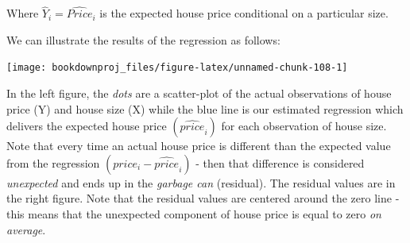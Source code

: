 \documentclass[
]{book}
\newenvironment{Shaded}{\begin{snugshade}}{\end{snugshade}}
\newcommand{\AttributeTok}[1]{\textcolor[rgb]{0.77,0.63,0.00}{#1}}
\newcommand{\DecValTok}[1]{\textcolor[rgb]{0.00,0.00,0.81}{#1}}
\newcommand{\FunctionTok}[1]{\textcolor[rgb]{0.00,0.00,0.00}{#1}}
\newcommand{\NormalTok}[1]{#1}
\newcommand{\SpecialCharTok}[1]{\textcolor[rgb]{0.00,0.00,0.00}{#1}}
\newcommand{\StringTok}[1]{\textcolor[rgb]{0.31,0.60,0.02}{#1}}
\begin{document}
Where \(\hat{Y}_i=\hat{Price}_i\) is the expected house price conditional on a particular size.

We can illustrate the results of the regression as follows:

\begin{Shaded}
\end{Shaded}

\begin{center}\texttt{[image: bookdownproj\_files/figure-latex/unnamed-chunk-108-1]} \end{center}

In the left figure, the \emph{dots} are a scatter-plot of the actual observations of house price (Y) and house size (X) while the blue line is our estimated regression which delivers the expected house price \((\hat{price}_i)\) for each observation of house size. Note that every time an actual house price is different than the expected value from the regression \((price_i - \hat{price}_i)\) - then that difference is considered \emph{unexpected} and ends up in the \emph{garbage can} (residual). The residual values are in the right figure. Note that the residual values are centered around the zero line - this means that the unexpected component of house price is equal to zero \emph{on average}.
\end{document}

